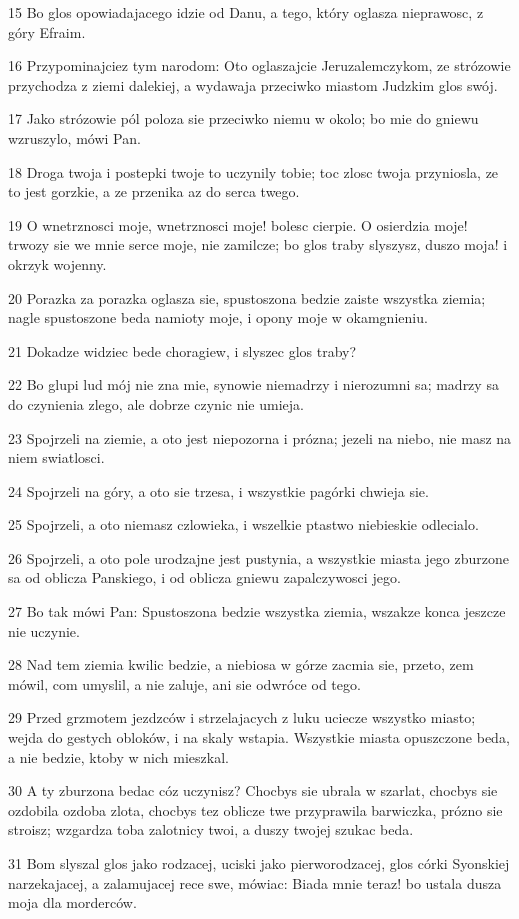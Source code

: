 \par 15 Bo glos opowiadajacego idzie od Danu, a tego, który oglasza nieprawosc, z góry Efraim.
\par 16 Przypominajciez tym narodom: Oto oglaszajcie Jeruzalemczykom, ze strózowie przychodza z ziemi dalekiej, a wydawaja przeciwko miastom Judzkim glos swój.
\par 17 Jako strózowie pól poloza sie przeciwko niemu w okolo; bo mie do gniewu wzruszylo, mówi Pan.
\par 18 Droga twoja i postepki twoje to uczynily tobie; toc zlosc twoja przyniosla, ze to jest gorzkie, a ze przenika az do serca twego.
\par 19 O wnetrznosci moje, wnetrznosci moje! bolesc cierpie. O osierdzia moje! trwozy sie we mnie serce moje, nie zamilcze; bo glos traby slyszysz, duszo moja! i okrzyk wojenny.
\par 20 Porazka za porazka oglasza sie, spustoszona bedzie zaiste wszystka ziemia; nagle spustoszone beda namioty moje, i opony moje w okamgnieniu.
\par 21 Dokadze widziec bede choragiew, i slyszec glos traby?
\par 22 Bo glupi lud mój nie zna mie, synowie niemadrzy i nierozumni sa; madrzy sa do czynienia zlego, ale dobrze czynic nie umieja.
\par 23 Spojrzeli na ziemie, a oto jest niepozorna i prózna; jezeli na niebo, nie masz na niem swiatlosci.
\par 24 Spojrzeli na góry, a oto sie trzesa, i wszystkie pagórki chwieja sie.
\par 25 Spojrzeli, a oto niemasz czlowieka, i wszelkie ptastwo niebieskie odlecialo.
\par 26 Spojrzeli, a oto pole urodzajne jest pustynia, a wszystkie miasta jego zburzone sa od oblicza Panskiego, i od oblicza gniewu zapalczywosci jego.
\par 27 Bo tak mówi Pan: Spustoszona bedzie wszystka ziemia, wszakze konca jeszcze nie uczynie.
\par 28 Nad tem ziemia kwilic bedzie, a niebiosa w górze zacmia sie, przeto, zem mówil, com umyslil, a nie zaluje, ani sie odwróce od tego.
\par 29 Przed grzmotem jezdzców i strzelajacych z luku uciecze wszystko miasto; wejda do gestych obloków, i na skaly wstapia. Wszystkie miasta opuszczone beda, a nie bedzie, ktoby w nich mieszkal.
\par 30 A ty zburzona bedac cóz uczynisz? Chocbys sie ubrala w szarlat, chocbys sie ozdobila ozdoba zlota, chocbys tez oblicze twe przyprawila barwiczka, prózno sie stroisz; wzgardza toba zalotnicy twoi, a duszy twojej szukac beda.
\par 31 Bom slyszal glos jako rodzacej, uciski jako pierworodzacej, glos córki Syonskiej narzekajacej, a zalamujacej rece swe, mówiac: Biada mnie teraz! bo ustala dusza moja dla morderców.


